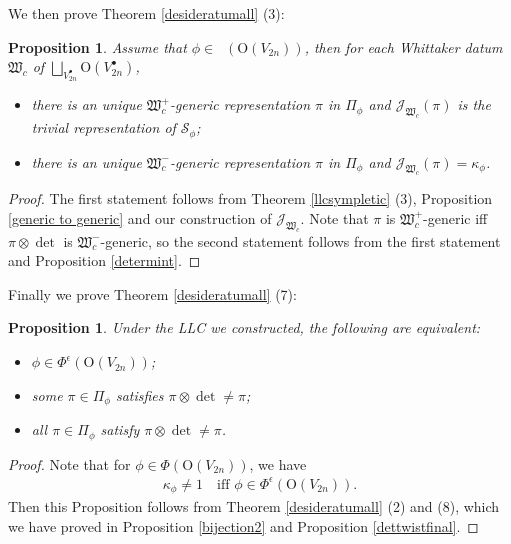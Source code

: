 \documentclass[article]{article}
\numberwithin{equation}{section}
\newtheorem{proposition}[theorem]{Proposition}
\theoremstyle{definition}
\DeclareMathOperator{\Para}{\Phi_{temp}}
\begin{document}
 

We then prove Theorem \ref{desideratumall} (3): 
\begin{proposition}\label{generic}
	Assume that $\phi\in \Para(\mathrm O(V_{2n}))$, then for each Whittaker datum $\mathfrak W_{c}$ of $\bigsqcup_{V_{2n}^{\bullet}}\mathrm O(V_{2n}^\bullet)$,
	\begin{itemize}
		\item there is an unique $\mathfrak W^+_{c}$-generic representation $\pi$ in $\Pi_{\phi}$ and $\mathcal J_{\mathfrak W_{c}}(\pi)$ is the trivial representation of $\mathcal {S}_{\phi}$; 
		\item there is an unique $\mathfrak W^-_{c}$-generic representation $\pi$ in $\Pi_{\phi}$ and $\mathcal J_{\mathfrak W_{c}}(\pi)=\kappa_{\phi}$.  
	\end{itemize}
\end{proposition}
\begin{proof}
	The first statement follows from Theorem \ref{llcsympletic} (3),  Proposition \ref{generic to generic} and our construction of $\mathcal J_{\mathfrak W_{c}}$. Note that $\pi$ is $\mathfrak W^+_{c}$-generic iff $\pi\otimes\det$ is $\mathfrak W^{-}_{c}$-generic, so the second statement follows from the first statement and Proposition \ref{determint}.    
\end{proof}


Finally we prove Theorem \ref{desideratumall} (7): 
\begin{proposition}
Under the LLC we constructed, the following are equivalent: 
	\begin{itemize}
		\item 	$\phi \in \Phi^{\epsilon}\left(\mathrm{O}\left(V_{2 n}\right)\right)$;
		\item some $\pi\in \Pi_{\phi}$ satisfies $\pi \otimes \det \neq \pi$;
		\item 	
		all $\pi\in \Pi_{\phi}$ satisfy $\pi \otimes\det 
		\neq \pi$. 
	\end{itemize} 
\end{proposition}
\begin{proof}
	Note that for $\phi\in \Phi(\mathrm O(V_{2n}))$, we have 
	\begin{align*}
	\kappa_{\phi}\neq 1 \quad \mbox{iff $\phi\in \Phi^{\epsilon}(\mathrm O(V_{2n}))$}.
	\end{align*}
	Then this Proposition follows from Theorem \ref{desideratumall} (2) and (8), which we have proved in Proposition \ref{bijection2} and Proposition \ref{dettwistfinal}. 
\end{proof}
\end{document}

